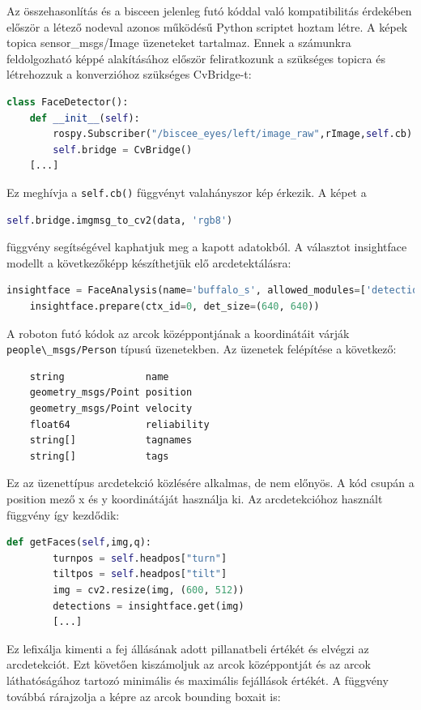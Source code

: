 Az összehasonlítás és a bisceen jelenleg futó kóddal való kompatibilitás érdekében először a létező nodeval azonos működésű Python scriptet hoztam létre. A képek topica sensor\_msgs/Image üzeneteket tartalmaz. Ennek a számunkra feldolgozható képpé alakításához először feliratkozunk a szükséges topicra és létrehozzuk a konverzióhoz szükséges CvBridge-t:
\begin{lstlisting}[language=Python]
    class FaceDetector():
    def __init__(self):
        rospy.Subscriber("/biscee_eyes/left/image_raw",rImage,self.cb)
        self.bridge = CvBridge()
    [...]
\end{lstlisting}
Ez meghívja a \lstinline{self.cb()} függvényt valahányszor kép érkezik. A képet a
\begin{lstlisting}[language=Python]
    self.bridge.imgmsg_to_cv2(data, 'rgb8')
\end{lstlisting}
függvény segítségével kaphatjuk meg a kapott adatokból. A választot insightface modellt a következőképp készíthetjük elő arcdetektálásra:
\begin{lstlisting}[language=Python]
    insightface = FaceAnalysis(name='buffalo_s', allowed_modules=['detection'])
    insightface.prepare(ctx_id=0, det_size=(640, 640))
\end{lstlisting}
A roboton futó kódok az arcok középpontjának a koordinátáit várják \lstinline{people\_msgs/Person} típusú üzenetekben. Az üzenetek felépítése a következő:
\begin{lstlisting}
    string              name
    geometry_msgs/Point position
    geometry_msgs/Point velocity
    float64             reliability
    string[]            tagnames
    string[]            tags
\end{lstlisting}
Ez az üzenettípus arcdetekció közlésére alkalmas, de nem előnyös. A kód csupán a position mező x és y koordinátáját használja ki. Az arcdetekcióhoz használt függvény így kezdődik:
\begin{lstlisting}[language=Python]
    def getFaces(self,img,q):
        turnpos = self.headpos["turn"]
        tiltpos = self.headpos["tilt"]
        img = cv2.resize(img, (600, 512))
        detections = insightface.get(img)
        [...]
\end{lstlisting}
Ez lefixálja kimenti a fej állásának adott pillanatbeli értékét és elvégzi az arcdetekciót. Ezt követően kiszámoljuk az arcok középpontját és az arcok láthatóságához tartozó minimális és maximális fejállások értékét. A függvény továbbá rárajzolja a képre az arcok bounding boxait is:
